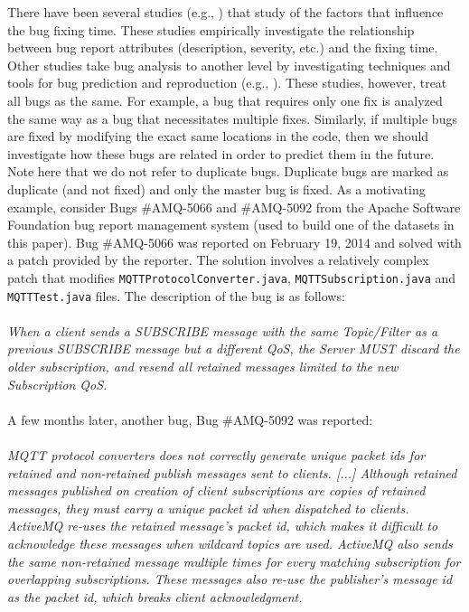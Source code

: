 There have been several studies (e.g., \cite{Weiß2007, Zhang2013}) that study of the factors that influence the bug fixing time.
These studies   empirically investigate the relationship between bug report attributes (description, severity, etc.) and the fixing time.
Other studies take bug analysis to another level by investigating techniques and tools for bug prediction and reproduction (e.g., \cite{Chen2013, Kim2007a, Nayrolles2015}).
These studies, however, treat all bugs as the same.
For example, a bug that requires only one fix is analyzed the same way as a bug that necessitates multiple fixes.
Similarly, if multiple bugs are fixed by modifying the exact same locations in the code, then we should investigate how these bugs are related in order to predict them in the future.
Note here that we do not refer to duplicate bugs.
Duplicate bugs are marked as duplicate (and not fixed) and only the master bug is fixed.
As a motivating example, consider Bugs \#AMQ-5066 and \#AMQ-5092 from the Apache Software Foundation bug report management system (used to build one of the datasets in this paper).
Bug \#AMQ-5066 was reported on February 19, 2014 and solved with a patch provided by the reporter.
The solution involves a relatively complex patch that modifies {\tt MQTTProtocolConverter.java}, {\tt MQTTSubscription.java} and {\tt MQTTTest.java} files.
The description of the bug is as follows:
\\ \\
{\it When a client sends a SUBSCRIBE message with the same Topic/Filter as a previous SUBSCRIBE message but a different QoS, the Server MUST discard the older subscription, and resend all retained messages limited to the new Subscription QoS.}
\\ \\
A few months later, another bug, Bug \#AMQ-5092 was reported:
\\ \\
{\it MQTT protocol converters does not correctly generate unique packet ids for retained and non-retained publish messages sent to clients.
[...] Although retained messages published on creation of client subscriptions are copies of retained messages, they must carry a unique packet id when dispatched to clients.
ActiveMQ re-uses the retained message's packet id, which makes it difficult to  acknowledge these messages when wildcard topics are used.
ActiveMQ also sends the same non-retained message multiple times for every matching subscription for overlapping subscriptions.
These messages also re-use the publisher's message id as the packet id, which breaks client acknowledgment.}
